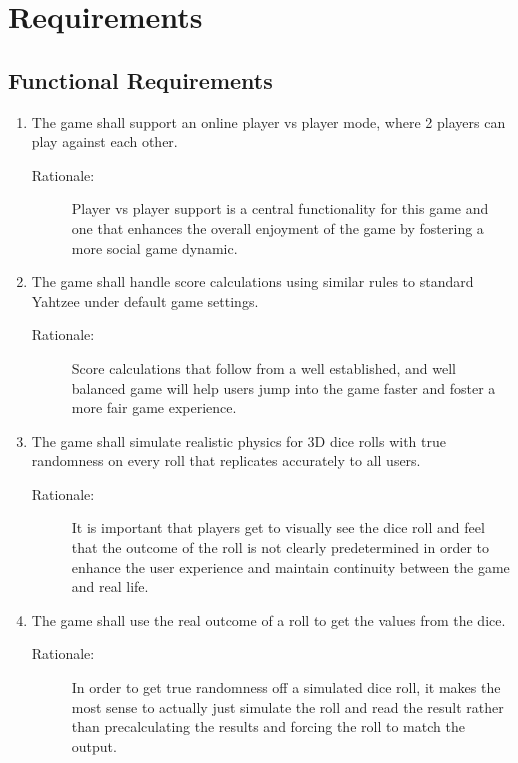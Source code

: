 \section{Requirements}

\subsection{Functional Requirements}

\begin{enumerate}[label=R\arabic*, start=1, left=0pt]

    \item \label{R1} The game shall support an online player vs player mode, where 2 players can play against each other.
    \begin{description}
        \item[Rationale:] Player vs player support is a central functionality for this game and one that enhances the overall enjoyment of the game by fostering a more social game dynamic.
    \end{description}

    \item \label{R2} The game shall handle score calculations using similar rules to standard Yahtzee under default game settings.
    \begin{description}
        \item[Rationale:] Score calculations that follow from a well established, and well balanced game will help users jump into the game faster and foster a more fair game experience.
    \end{description}

    \item \label{R3} The game shall simulate realistic physics for 3D dice rolls with true randomness on every roll that replicates accurately to all users.
    \begin{description}
        \item[Rationale:] It is important that players get to visually see the dice roll and feel that the outcome of the roll is not clearly predetermined in order to enhance the user experience and maintain continuity between the game and real life.
    \end{description}

    \item \label{R4} The game shall use the real outcome of a roll to get the values from the dice.
    \begin{description}
        \item[Rationale:] In order to get true randomness off a simulated dice roll, it makes the most sense to actually just simulate the roll and read the result rather than precalculating the results and forcing the roll to match the output.
    \end{description}


\end{enumerate}
